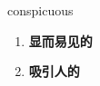 
\begin{frame}
{\huge conspicuous}
\begin{center}
\begin{enumerate}\Large
  \item \textbf{显而易见的}
  \item \textbf{吸引人的}
\end{enumerate}
\end{center}
\end{frame}
